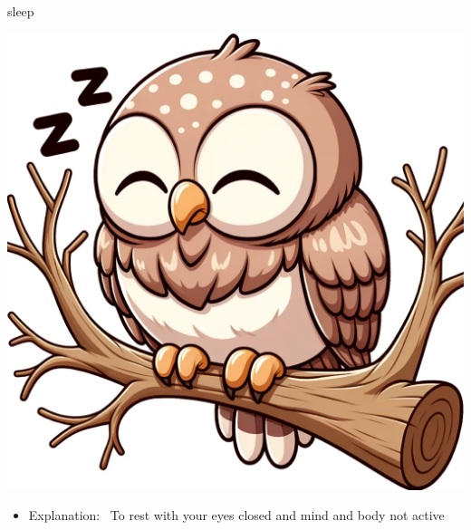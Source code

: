 \documentclass[avery5371, grid,frame]{flashcards}
\begin{document}
\renewcommand{\cardpaper}{a4paper}
\renewcommand{\cardpapermode}{landscape}
\renewcommand{\cardrows}{2}
\renewcommand{\cardcolumns}{2}
\setlength{\cardheight}{3.5in}
\setlength{\cardwidth}{5.0in}
\setlength{\topoffset}{0.50in}
\setlength{\oddoffset}{0.50in}
\setlength{\evenoffset}{0.50in}

\begin{flashcard}{sleep}
    \vspace*{\fill}
    \begin{center}
        \begin{minipage}[c]{.45\textwidth}
            \includegraphics[width=\textwidth]{cards/s/sleep/sleep - an owl perched on a tree branch, head tucked under its wing, snoozing during the day.png}
        \end{minipage}
        \begin{minipage}[c]{.45\textwidth}
            \begin{itemize}\setlength\itemsep{12pt}
            \item Explanation: \ To rest with your eyes closed and mind and body not active


\end{itemize}
\end{minipage}
\end{center}
\end{flashcard}
\end{document}
